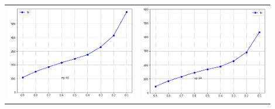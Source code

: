 \documentclass{article}
\begin{document}
\begin{table}[h!]
\begin{tabular}{p{0.45\linewidth}p{0.45\linewidth}}
            \includegraphics[width=\linewidth]{fp40} & \includegraphics[width=\linewidth]{fp14}\\ 
        \end{tabular}
    \end{table}
\end{document}
